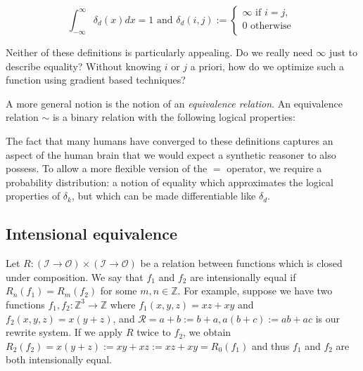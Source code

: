 \documentclass[11pt]{article}
\begin{document}
    $$
    \int_{-\infty}^{\infty} \delta_d (x)dx = 1 \text{ and } \delta_d(i, j) :=
    \begin{cases}
        \infty \text{ if } i = j, \\
        0 \text{ otherwise }\\
    \end{cases}
    $$

    Neither of these definitions is particularly appealing. Do we really need $\infty$ just to describe equality? Without knowing $i$ or $j$ a priori, how do we optimize such a function using gradient based techniques?


    A more general notion is the notion of an \textit{equivalence relation}. An equivalence relation $\sim$ is a binary relation with the following logical properties:


    The fact that many humans have converged to these definitions captures an aspect of the human brain that we would expect a synthetic reasoner to also possess. To allow a more flexible version of the $=$ operator, we require a probability distribution: a notion of equality which approximates the logical properties of $\delta_k$, but which can be made differentiable like $\delta_d$.

    \subsection{Intensional equivalence}\label{subsec:intensional-equivalence}

    Let $R: (\mathcal{I} \rightarrow \mathcal{O}) \times (\mathcal{I}\rightarrow \mathcal{O})$ be a relation between functions which is closed under composition. We say that $f_1$ and $f_2$ are intensionally equal if $R_n(f_1)=R_m(f_2)$ for some $m,n \in \mathbb{Z}$. For example, suppose we have two functions $f_1, f_2: \mathbb{Z}^3 \rightarrow \mathbb{Z}$ where $f_1(x, y, z)=xz + xy$ and $f_2(x, y, z)=x(y + z)$, and $\mathcal{R}={a + b := b + a, a(b + c) := ab + ac}$ is our rewrite system. If we apply $R$ twice to $f_2$, we obtain $R_2(f_2)=x(y + z):=xy + xz:=xz + xy=R_0(f_1)$ and thus $f_1$ and $f_2$ are both intensionally equal.
\end{document}
